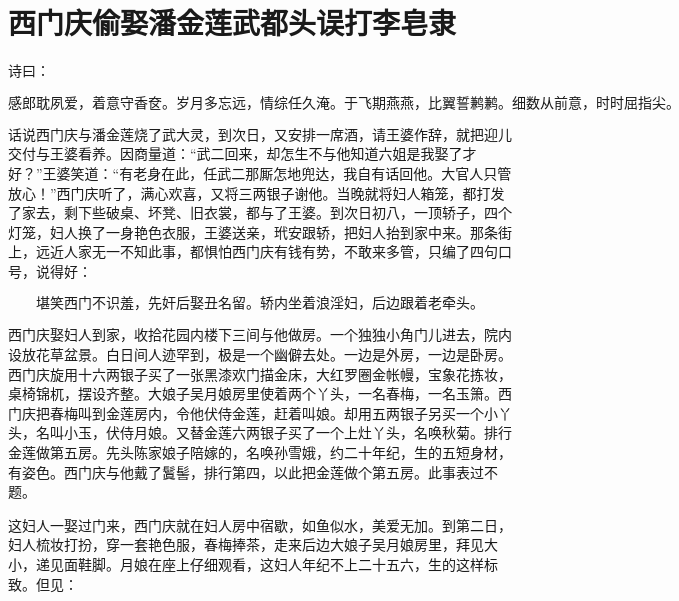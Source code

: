 

\chapter{西门庆偷娶潘金莲\KG 武都头误打李皂隶}


诗曰：

\[
感郎耽夙爱，着意守香奁。岁月多忘远，情综任久淹。
于飞期燕燕，比翼誓鹣鹣。细数从前意，时时屈指尖。
\]

话说西门庆与潘金莲烧了武大灵，到次日，又安排一席酒，请王婆作辞，就把迎儿交付与王婆看养。因商量道：“武二回来，却怎生不与他知道六姐是我娶了才好？”王婆笑道：“有老身在此，任武二那厮怎地兜达，我自有话回他。大官人只管放心！”西门庆听了，满心欢喜，又将三两银子谢他。当晚就将妇人箱笼，都打发了家去，剩下些破桌、坏凳、旧衣裳，都与了王婆。到次日初八，一顶轿子，四个灯笼，妇人换了一身艳色衣服，王婆送亲，玳安跟轿，把妇人抬到家中来。那条街上，远近人家无一不知此事，都惧怕西门庆有钱有势，不敢来多管，只编了四句口号，说得好：

\[
堪笑西门不识羞，先奸后娶丑名留。
轿内坐着浪淫妇，后边跟着老牵头。
\]

西门庆娶妇人到家，收拾花园内楼下三间与他做房。一个独独小角门儿进去，院内设放花草盆景。白日间人迹罕到，极是一个幽僻去处。一边是外房，一边是卧房。西门庆旋用十六两银子买了一张黑漆欢门描金床，大红罗圈金帐幔，宝象花拣妆，桌椅锦杌，摆设齐整。大娘子吴月娘房里使着两个丫头，一名春梅，一名玉箫。西门庆把春梅叫到金莲房内，令他伏侍金莲，赶着叫娘。却用五两银子另买一个小丫头，名叫小玉，伏侍月娘。又替金莲六两银子买了一个上灶丫头，名唤秋菊。排行金莲做第五房。先头陈家娘子陪嫁的，名唤孙雪娥，约二十年纪，生的五短身材，有姿色。西门庆与他戴了鬒髻，排行第四，以此把金莲做个第五房。此事表过不题。

这妇人一娶过门来，西门庆就在妇人房中宿歇，如鱼似水，美爱无加。到第二日，妇人梳妆打扮，穿一套艳色服，春梅捧茶，走来后边大娘子吴月娘房里，拜见大小，递见面鞋脚。月娘在座上仔细观看，这妇人年纪不上二十五六，生的这样标致。但见：

